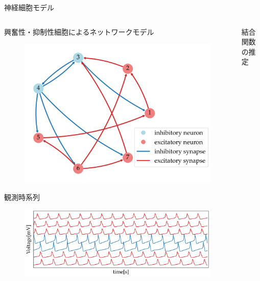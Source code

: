 \begin{frame}{神経細胞モデル}
  \begin{columns}[t]
    \begin{column}{0.5\textwidth}
      \checkmark 興奮性・抑制性細胞によるネットワークモデル
      \begin{figure}
        \includegraphics[width=0.9\columnwidth]{figs/snn_netplot.pdf}
      \end{figure}
      \checkmark 観測時系列
      \begin{figure}
        \includegraphics[width=0.9\columnwidth]{figs/snn_volt.pdf}
      \end{figure}
    \end{column}
    \begin{column}{0.5\textwidth}
      \checkmark 結合関数の推定
      \begin{figure}

\end{figure}
\end{column}
\end{columns}
\end{frame}
